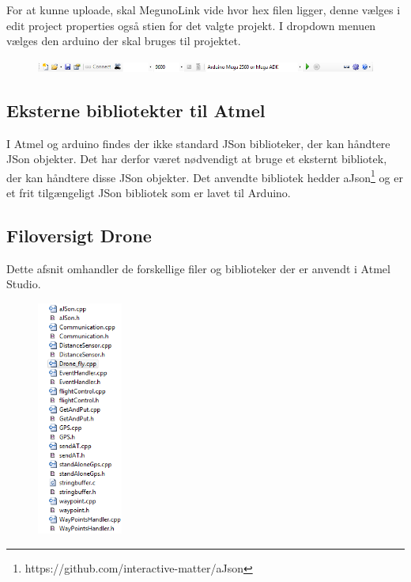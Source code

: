 For at kunne uploade, skal MegunoLink vide hvor hex filen ligger, denne vælges i edit project properties også stien for det valgte projekt.
I dropdown menuen vælges den arduino der skal bruges til projektet.
\begin{figure}[H]
	\centering
	\includegraphics[width=1\textwidth]{Billeder/implementation/Howtoguide/meguno_bar.png}
\end{figure}



\subsection{Eksterne bibliotekter til Atmel}

I Atmel og arduino findes der ikke standard JSon biblioteker, der kan håndtere JSon objekter. Det har derfor været nødvendigt at bruge et eksternt bibliotek, der kan håndtere disse JSon objekter.
Det anvendte bibliotek hedder aJson\footnote{https://github.com/interactive-matter/aJson} og er et frit tilgængeligt JSon bibliotek som er lavet til Arduino.


\subsection{Filoversigt Drone}

Dette afsnit omhandler de forskellige filer og biblioteker der er anvendt i Atmel Studio. 


\begin{figure}[H]
	\centering
	\includegraphics[width=0.25\textwidth]{Billeder/implementation/Howtoguide/atmel_filer.png}
\end{figure}


